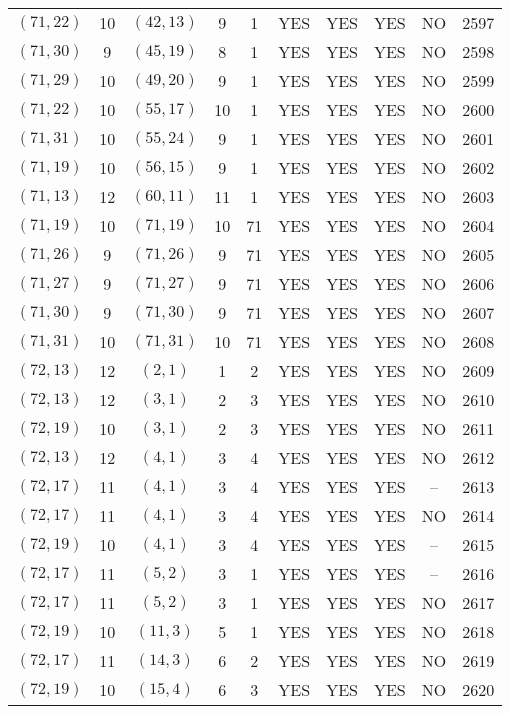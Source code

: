 \begin{longtable}{|c|c|c|c|c|c|c|c|c|c|}
$(71, 22)$ & 10 & $(42, 13)$ & 9 & 1 & YES & YES & YES & NO & 2597\\
$(71, 30)$ & 9 & $(45, 19)$ & 8 & 1 & YES & YES & YES & NO & 2598\\
$(71, 29)$ & 10 & $(49, 20)$ & 9 & 1 & YES & YES & YES & NO & 2599\\
$(71, 22)$ & 10 & $(55, 17)$ & 10 & 1 & YES & YES & YES & NO & 2600\\
$(71, 31)$ & 10 & $(55, 24)$ & 9 & 1 & YES & YES & YES & NO & 2601\\
$(71, 19)$ & 10 & $(56, 15)$ & 9 & 1 & YES & YES & YES & NO & 2602\\
$(71, 13)$ & 12 & $(60, 11)$ & 11 & 1 & YES & YES & YES & NO & 2603\\
$(71, 19)$ & 10 & $(71, 19)$ & 10 & 71 & YES & YES & YES & NO & 2604\\
$(71, 26)$ & 9 & $(71, 26)$ & 9 & 71 & YES & YES & YES & NO & 2605\\
$(71, 27)$ & 9 & $(71, 27)$ & 9 & 71 & YES & YES & YES & NO & 2606\\
$(71, 30)$ & 9 & $(71, 30)$ & 9 & 71 & YES & YES & YES & NO & 2607\\
$(71, 31)$ & 10 & $(71, 31)$ & 10 & 71 & YES & YES & YES & NO & 2608\\
$(72, 13)$ & 12 & $(2, 1)$ & 1 & 2 & YES & YES & YES & NO & 2609\\
$(72, 13)$ & 12 & $(3, 1)$ & 2 & 3 & YES & YES & YES & NO & 2610\\
$(72, 19)$ & 10 & $(3, 1)$ & 2 & 3 & YES & YES & YES & NO & 2611\\
$(72, 13)$ & 12 & $(4, 1)$ & 3 & 4 & YES & YES & YES & NO & 2612\\
$(72, 17)$ & 11 & $(4, 1)$ & 3 & 4 & YES & YES & YES & -- & 2613\\
$(72, 17)$ & 11 & $(4, 1)$ & 3 & 4 & YES & YES & YES & NO & 2614\\
$(72, 19)$ & 10 & $(4, 1)$ & 3 & 4 & YES & YES & YES & -- & 2615\\
$(72, 17)$ & 11 & $(5, 2)$ & 3 & 1 & YES & YES & YES & -- & 2616\\
$(72, 17)$ & 11 & $(5, 2)$ & 3 & 1 & YES & YES & YES & NO & 2617\\
$(72, 19)$ & 10 & $(11, 3)$ & 5 & 1 & YES & YES & YES & NO & 2618\\
$(72, 17)$ & 11 & $(14, 3)$ & 6 & 2 & YES & YES & YES & NO & 2619\\
$(72, 19)$ & 10 & $(15, 4)$ & 6 & 3 & YES & YES & YES & NO & 2620\\

\end{longtable}
